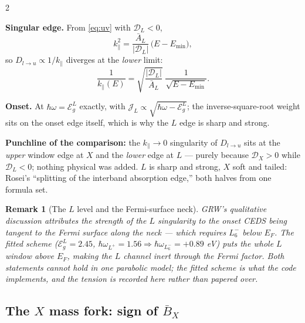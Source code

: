 \documentclass[11pt,a4paper]{article}
\numberwithin{equation}{section}
\newcommand{\hw}{\hbar\omega}
\newcommand{\EgL}{\mathcal{E}_g^{L}}
\newcommand{\cD}{\mathcal{D}}
\newcommand{\cJ}{\mathcal{J}}
\newcommand{\Ab}{\bar{A}}
\newcommand{\Bb}{\bar{B}}
\newcommand{\kpar}{k_{\parallel}}
\newcommand{\Dlu}{D_{l\to u}}
\newcommand{\wLu}{\hbar\omega_{L_6^-}}
\newcommand{\wLl}{\hbar\omega_{L^+}}
\newtheorem{remark}{Remark}[section]
\begin{document}
\begin{paracol}{2}
\begin{rightcolumn}
\textbf{Singular edge.}  From \eqref{eq:uv} with $\cD_L<0$,
\[
\kpar^{2}=\frac{\Ab_L}{|\cD_L|}\,\bigl(E-E_{\min}\bigr),
\]
so $\Dlu\propto1/\kpar$ diverges at the \emph{lower} limit:
\[
\frac{1}{\kpar(E)}=\sqrt{\frac{|\cD_L|}{\Ab_L}}\;
\frac{1}{\sqrt{E-E_{\min}}} .
\]

\textbf{Onset.}  At $\hw=\EgL$ exactly, with
$\cJ_L\propto\sqrt{\hw-\EgL}$; the inverse-square-root weight sits on
the onset edge itself, which is why the $L$ edge is sharp and strong.
\end{rightcolumn}

\end{paracol}

\medskip
\noindent
\textbf{Punchline of the comparison:} the $\kpar\to0$ singularity of
$\Dlu$ sits at the \emph{upper} window edge at $X$ and the
\emph{lower} edge at $L$ --- purely because $\cD_X>0$ while
$\cD_L<0$; nothing physical was added.  $L$ is sharp and strong, $X$
soft and tailed: Rosei's ``splitting of the interband absorption
edge,'' both halves from one formula set.

\begin{remark}[The $L$ level and the Fermi-surface neck]\label{rem:neck}
GRW's qualitative discussion attributes the strength of the $L$
singularity to the onset CEDS being tangent to the Fermi surface along
the neck --- which requires $L_6^-$ \emph{below} $E_F$.  The fitted
scheme ($\EgL=2.45$, $\wLl=1.56\Rightarrow\wLu=+0.89$ eV) puts the
whole $L$ window \emph{above} $E_F$, making the $L$ channel inert
through the Fermi factor.  Both statements cannot hold in one
parabolic model; the fitted scheme is what the code implements, and
the tension is recorded here rather than papered over.
\end{remark}

\subsection{The $X$ mass fork: sign of $\Bb_X$}\label{sec:fork}
\end{document}
